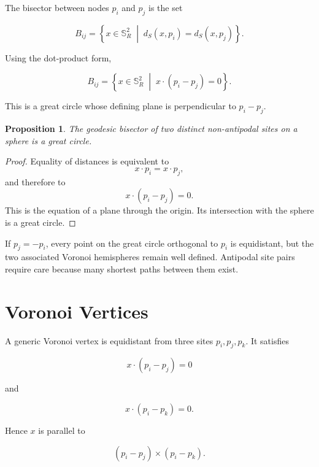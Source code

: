 \documentclass[11pt,fleqn]{book}
\numberwithin{equation}{chapter}
\theoremstyle{plain}
\newtheorem{proposition}[theorem]{Proposition}
\theoremstyle{definition}
\theoremstyle{remark}
\newcommand{\Sphere}{\mathbb{S}^{2}}
\newcommand{\suchthat}{\;\middle|\;}
\begin{document}
The bisector between nodes \(p_i\) and \(p_j\) is the set

\begin{equation}
    B_{ij}
    =
    \left\{
    x\in\Sphere_R
    \suchthat
    d_S(x,p_i)=d_S(x,p_j)
    \right\}.
\end{equation}

Using the dot-product form,

\begin{equation}
    B_{ij}
    =
    \left\{
    x\in\Sphere_R
    \suchthat
    x\cdot(p_i-p_j)=0
    \right\}.
\end{equation}

This is a great circle whose defining plane is perpendicular to \(p_i-p_j\).

\begin{proposition}
The geodesic bisector of two distinct non-antipodal sites on a sphere is a great circle.
\end{proposition}

\begin{proof}
Equality of distances is equivalent to
\[
x\cdot p_i=x\cdot p_j,
\]
and therefore to
\[
x\cdot(p_i-p_j)=0.
\]
This is the equation of a plane through the origin. Its intersection with the sphere is a great circle.
\end{proof}

If \(p_j=-p_i\), every point on the great circle orthogonal to \(p_i\) is equidistant, but the two associated Voronoi hemispheres remain well defined. Antipodal site pairs require care because many shortest paths between them exist.

\section{Voronoi Vertices}

A generic Voronoi vertex is equidistant from three sites \(p_i,p_j,p_k\). It satisfies

\begin{equation}
    x\cdot(p_i-p_j)=0
\end{equation}

and

\begin{equation}
    x\cdot(p_i-p_k)=0.
\end{equation}

Hence \(x\) is parallel to

\begin{equation}
    (p_i-p_j)\times(p_i-p_k).
\end{equation}
\end{document}
